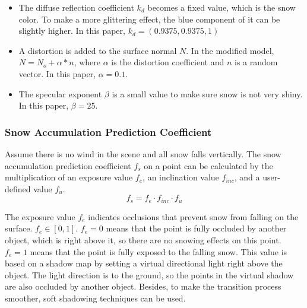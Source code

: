 \documentclass{article}
\begin{document}
\begin{itemize}
  \item The diffuse reflection coefficient \( k_d \) becomes a fixed value, which is the snow color. To make a more glittering effect, the 
  blue component of it can be slightly higher. In this paper, \( k_d = (0.9375, 0.9375, 1)\)
  \item A distortion is added to the surface normal \( N \). In the modified model, \( N = N_{o} + \alpha * n\), where \( \alpha \) is 
  the distortion coefficient and \( n \) is a random vector. In this paper, \( \alpha = 0.1\).
  \item The specular exponent \( \beta \) is a small value to make sure snow is not very shiny. In this paper, \( \beta = 25\).
\end{itemize}

\subsubsection {Snow Accumulation Prediction Coefficient}
Assume there is no wind in the scene and all snow falls vertically. The snow accumulation prediction coefficient 
\( f_{s} \) on a point can be calculated by the multiplication of an exposure value \( f_{e} \), an inclination 
value \( f_{inc} \), and a user-defined value \( f_{u} \).
\[
  f_{s} = f_{e} \cdot f_{inc} \cdot f_{u}
\]

The exposure value \( f_{e} \) indicates occlusions that prevent snow from falling on the surface. %
\( f_{e} \in [0, 1] \). \( f_{e}=0 \) means that the point is fully occluded by another object, which is right 
above it, so there are no snowing effects on this point. \( f_{e}=1 \) means that the point is fully exposed to the 
falling snow. This value is based on a shadow map by setting a virtual directional light right above the object. 
The light direction is to the ground, so the points in the virtual shadow are also occluded by another object. 
Besides, to make the transition process smoother, soft shadowing techniques can be used. 
\end{document}
